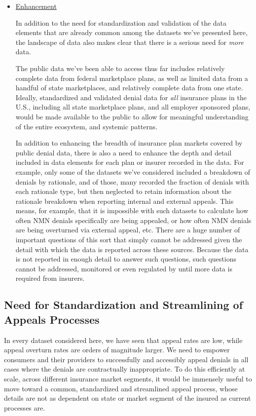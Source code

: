 \documentclass[12pt, a4paper,twoside]{report}
\theoremstyle{plain} %
\theoremstyle{definition} %
\theoremstyle{remark} %
\numberwithin{equation}{chapter}
\begin{document}
\begin{itemize}
			\item \underline{Enhancement}
			
			In addition to the need for standardization and validation of the data elements that are already common among the datasets we've presented here, the landscape of data also makes clear that there is a serious need for \emph{more} data.
			
			The public data we've been able to access thus far includes relatively complete data from federal marketplace plans, as well as limited data from a handful of state marketplaces, and relatively complete data from one state. Ideally, standardized and validated denial data for \emph{all} insurance plans in the U.S., including all state marketplace plans, and all employer sponsored plans, would be made available to the public to allow for meaningful understanding of the entire ecosystem, and systemic patterns.
			
			In addition to enhancing the breadth of insurance plan markets covered by public denial data, there is also a need to enhance the depth and detail included in data elements for each plan or insurer recorded in the data. For example, only some of the datasets we've considered included a breakdown of denials by rationale, and of those, many recorded the fraction of denials with each rationale type, but then neglected to retain information about the rationale breakdown when reporting internal and external appeals. This means, for example, that it is impossible with such datasets to calculate how often NMN denials specifically are being appealed, or how often NMN denials are being overturned via external appeal, etc. There are a huge number of important questions of this sort that simply cannot be addressed given the detail with which the data is reported across these sources. Because the data is not reported in enough detail to answer such questions, such questions cannot be addressed, monitored or even regulated by until more data is required from insurers.
			
		\end{itemize}
		
		\subsection{Need for Standardization and Streamlining of Appeals Processes}
		
		In every dataset considered here, we have seen that appeal rates are low, while appeal overturn rates are orders of magnitude larger. We need to empower consumers and their providers to successfully and accessibly appeal denials in all cases where the denials are contractually inappropriate. To do this efficiently at scale, across different insurance market segments, it would be immensely useful to move toward a common, standardized and streamlined appeal process, whose details are not as dependent on state or market segment of the insured as current processes are.
		
\end{document}
